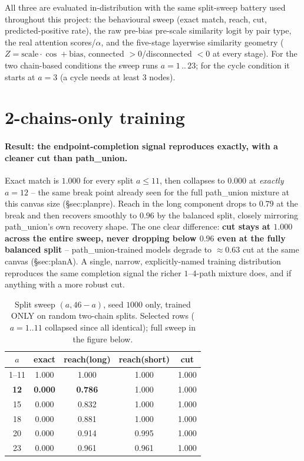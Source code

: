 \documentclass[11pt,a4paper]{article}
\begin{document}
All three are evaluated in-distribution with the same split-sweep battery used throughout this
project: the behavioural sweep (exact match, reach, cut, predicted-positive rate), the raw
pre-bias pre-scale similarity logit by pair type, the real attention scores/$\alpha$, and the
five-stage layerwise similarity geometry ($Z=\mathrm{scale}\cdot\cos+\mathrm{bias}$, connected
$>0$/disconnected $<0$ at every stage). For the two chain-based conditions the sweep runs
$a=1\,..\,23$; for the cycle condition it starts at $a=3$ (a cycle needs at least $3$ nodes).

\clearpage
\section{2-chains-only training}

\paragraph{Result: the endpoint-completion signal reproduces exactly, with a cleaner cut than
path\_union.} Exact match is $1.000$ for every split $a\le11$, then collapses to $0.000$ at
\emph{exactly} $a=12$ -- the same break point already seen for the full path\_union mixture at
this canvas size (\S sec:planpre). Reach in the long component drops to $0.79$ at the break and
then recovers smoothly to $0.96$ by the balanced split, closely mirroring path\_union's own
recovery shape. The one clear difference: \textbf{cut stays at $1.000$ across the entire sweep,
never dropping below $0.96$ even at the fully balanced split} -- path\_union-trained models
degrade to $\approx0.63$ cut at the same canvas (\S sec:planA). A single, narrow, explicitly-named
training distribution reproduces the same completion signal the richer $1$--$4$-path mixture
does, and if anything with a more robust cut.

\begin{table}[H]\centering\small
\begin{tabular}{ccccc}
\toprule
$a$ & exact & reach(long) & reach(short) & cut \\
\midrule
1--11 & 1.000 & 1.000 & 1.000 & 1.000 \\
\textbf{12} & \textbf{0.000} & \textbf{0.786} & 1.000 & 1.000 \\
15 & 0.000 & 0.832 & 1.000 & 1.000 \\
18 & 0.000 & 0.881 & 1.000 & 1.000 \\
20 & 0.000 & 0.914 & 0.995 & 1.000 \\
23 & 0.000 & 0.961 & 0.961 & 1.000 \\
\bottomrule
\end{tabular}
\caption{Split sweep $(a,46{-}a)$, seed $1000$ only, trained ONLY on random two-chain splits.
Selected rows ($a=1..11$ collapsed since all identical); full sweep in the figure below.}
\end{table}
\end{document}
